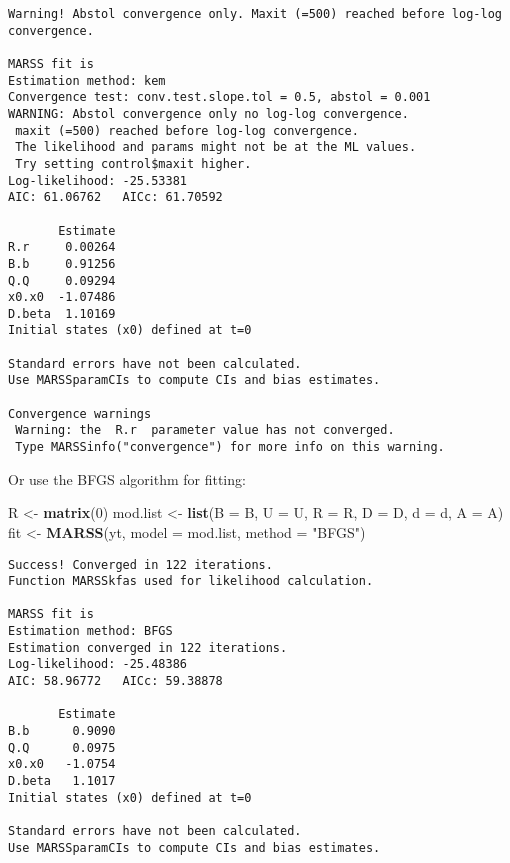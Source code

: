 \documentclass[12pt,]{book}
\newenvironment{Shaded}{\begin{snugshade}}{\end{snugshade}}
\newcommand{\DataTypeTok}[1]{\textcolor[rgb]{0.13,0.29,0.53}{#1}}
\newcommand{\DecValTok}[1]{\textcolor[rgb]{0.00,0.00,0.81}{#1}}
\newcommand{\KeywordTok}[1]{\textcolor[rgb]{0.13,0.29,0.53}{\textbf{#1}}}
\newcommand{\NormalTok}[1]{#1}
\newcommand{\StringTok}[1]{\textcolor[rgb]{0.31,0.60,0.02}{#1}}
\begin{document}
\begin{verbatim}
Warning! Abstol convergence only. Maxit (=500) reached before log-log convergence.

MARSS fit is
Estimation method: kem 
Convergence test: conv.test.slope.tol = 0.5, abstol = 0.001
WARNING: Abstol convergence only no log-log convergence.
 maxit (=500) reached before log-log convergence.
 The likelihood and params might not be at the ML values.
 Try setting control$maxit higher.
Log-likelihood: -25.53381 
AIC: 61.06762   AICc: 61.70592   
 
       Estimate
R.r     0.00264
B.b     0.91256
Q.Q     0.09294
x0.x0  -1.07486
D.beta  1.10169
Initial states (x0) defined at t=0

Standard errors have not been calculated. 
Use MARSSparamCIs to compute CIs and bias estimates.

Convergence warnings
 Warning: the  R.r  parameter value has not converged.
 Type MARSSinfo("convergence") for more info on this warning.
\end{verbatim}

Or use the BFGS algorithm for fitting:

\begin{Shaded}
\begin{Highlighting}[]
\NormalTok{R <-}\StringTok{ }\KeywordTok{matrix}\NormalTok{(}\DecValTok{0}\NormalTok{)}
\NormalTok{mod.list <-}\StringTok{ }\KeywordTok{list}\NormalTok{(}\DataTypeTok{B =}\NormalTok{ B, }\DataTypeTok{U =}\NormalTok{ U, }\DataTypeTok{R =}\NormalTok{ R, }\DataTypeTok{D =}\NormalTok{ D, }\DataTypeTok{d =}\NormalTok{ d, }\DataTypeTok{A =}\NormalTok{ A)}
\NormalTok{fit <-}\StringTok{ }\KeywordTok{MARSS}\NormalTok{(yt, }\DataTypeTok{model =}\NormalTok{ mod.list, }\DataTypeTok{method =} \StringTok{"BFGS"}\NormalTok{)}
\end{Highlighting}
\end{Shaded}

\begin{verbatim}
Success! Converged in 122 iterations.
Function MARSSkfas used for likelihood calculation.

MARSS fit is
Estimation method: BFGS 
Estimation converged in 122 iterations. 
Log-likelihood: -25.48386 
AIC: 58.96772   AICc: 59.38878   
 
       Estimate
B.b      0.9090
Q.Q      0.0975
x0.x0   -1.0754
D.beta   1.1017
Initial states (x0) defined at t=0

Standard errors have not been calculated. 
Use MARSSparamCIs to compute CIs and bias estimates.
\end{verbatim}
\end{document}
